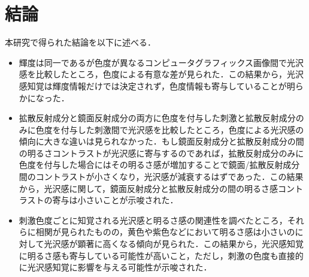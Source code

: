 \chapter{結論}

    本研究で得られた結論を以下に述べる．
    \begin{itemize}
        \item 輝度は同一であるが色度が異なるコンピュータグラフィックス画像間で光沢感を比較したところ，色度による有意な差が見られた．この結果から，光沢感知覚は輝度情報だけでは決定されず，色度情報も寄与していることが明らかになった．
        \item 拡散反射成分と鏡面反射成分の両方に色度を付与した刺激と拡散反射成分のみに色度を付与した刺激間で光沢感を比較したところ，色度による光沢感の傾向に大きな違いは見られなかった．もし鏡面反射成分と拡散反射成分の間の明るさコントラストが光沢感に寄与するのであれば，拡散反射成分のみに色度を付与した場合にはその明るさ感が増加することで鏡面/拡散反射成分間のコントラストが小さくなり，光沢感が減衰するはずであった．この結果から，光沢感に関して，鏡面反射成分と拡散反射成分の間の明るさ感コントラストの寄与は小さいことが示唆された．
        \item 刺激色度ごとに知覚される光沢感と明るさ感の関連性を調べたところ，それらに相関が見られたものの，黄色や紫色などにおいて明るさ感は小さいのに対して光沢感が顕著に高くなる傾向が見られた．この結果から，光沢感知覚に明るさ感も寄与している可能性が高いこと，ただし，刺激の色度も直接的に光沢感知覚に影響を与える可能性が示唆された．
    \end{itemize}
    \newpage
